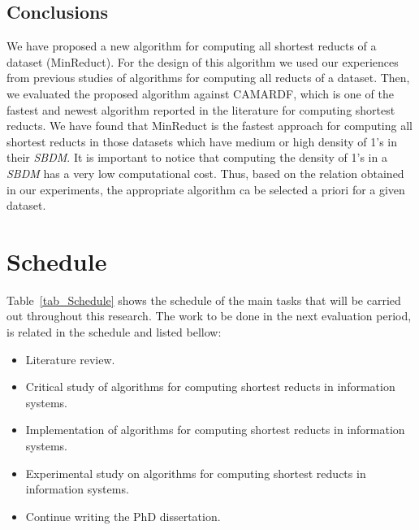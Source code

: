 \documentclass[authoryear,11pt]{elsarticle}
\begin{document}
\subsection{Conclusions} 

  We have proposed a new algorithm for computing all shortest reducts of a dataset (MinReduct). For the design of this algorithm we used our experiences from previous studies of algorithms for computing all reducts of a dataset. Then, we evaluated the proposed algorithm against CAMARDF, which is one of the fastest and newest algorithm reported in the literature for computing shortest reducts. We have found that MinReduct  is the fastest approach for computing all shortest reducts in those datasets which have medium or high density of 1's in their \textit{SBDM}. It is important to notice that computing the density of 1's in a \textit{SBDM} has a very low computational cost. Thus, based on the relation obtained in our experiments, the appropriate algorithm ca be selected a priori for a given dataset.

\section{Schedule}\label{sec_schedule}
  Table~\ref{tab_Schedule} shows the schedule of the main tasks that will be carried out throughout this research. The work to be done in the next evaluation period, is related in the schedule and listed bellow:
  
  \begin{itemize}
  	\itemsep0em 
  	\item Literature review.
  	\item Critical study of algorithms for computing shortest reducts in information systems.
  	\item Implementation of algorithms for computing shortest reducts in information systems.
  	\item Experimental study on algorithms for computing shortest reducts in information systems.
  	\item Continue writing the PhD dissertation.
  \end{itemize}
  
\end{document}
